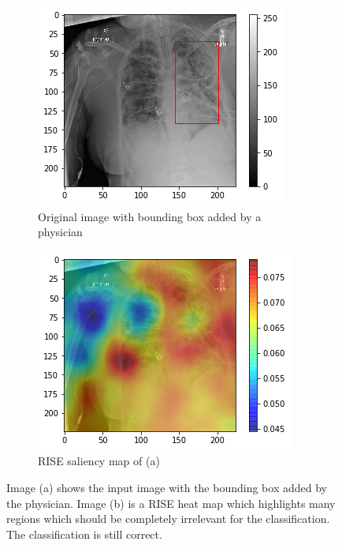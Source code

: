 \begin{figure}[H]
    \centering
    \begin{subfigure}[t]{.45\textwidth}
        \centering
        \includegraphics[width=\linewidth]{chapters/03_classification/images/rise2_bbox.png}
        \caption{Original image with bounding box added by a physician}
    \end{subfigure}\hspace{1cm}%
    \begin{subfigure}[t]{.45\textwidth}
        \centering
        \includegraphics[width=\linewidth]{chapters/03_classification/images/rise2_saliency.png}
        \caption{RISE saliency map of (a)}
    \end{subfigure}
    \caption{Image (a) shows the input image with the bounding box added by the physician. Image (b) is a RISE heat map which highlights many regions which should be completely irrelevant for the classification. The classification is still correct.}
    \label{rise_example_3}
\end{figure}



